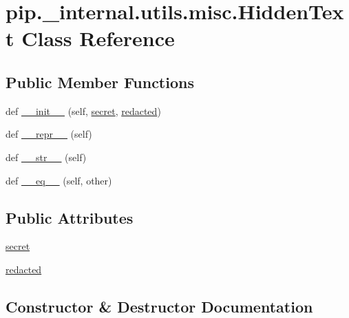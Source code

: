 \hypertarget{classpip_1_1__internal_1_1utils_1_1misc_1_1HiddenText}{}\section{pip.\+\_\+internal.\+utils.\+misc.\+Hidden\+Text Class Reference}
\label{classpip_1_1__internal_1_1utils_1_1misc_1_1HiddenText}
\subsection*{Public Member Functions}
\begin{DoxyCompactItemize}
\item 
def \hyperlink{classpip_1_1__internal_1_1utils_1_1misc_1_1HiddenText_a80a5e069d87d7a1997a9ceb48883479e}{\+\_\+\+\_\+init\+\_\+\+\_\+} (self, \hyperlink{classpip_1_1__internal_1_1utils_1_1misc_1_1HiddenText_aebe8a214872322901f368347a4449603}{secret}, \hyperlink{classpip_1_1__internal_1_1utils_1_1misc_1_1HiddenText_a7183b1d38734a749ba8a69126f20557a}{redacted})
\item 
def \hyperlink{classpip_1_1__internal_1_1utils_1_1misc_1_1HiddenText_a9bc27c6a58f062ed0c99fb73c4ea1a1c}{\+\_\+\+\_\+repr\+\_\+\+\_\+} (self)
\item 
def \hyperlink{classpip_1_1__internal_1_1utils_1_1misc_1_1HiddenText_a1931aa3ae663590a444d564b4f8990fb}{\+\_\+\+\_\+str\+\_\+\+\_\+} (self)
\item 
def \hyperlink{classpip_1_1__internal_1_1utils_1_1misc_1_1HiddenText_af13cc50e5644a79d0fe9da9e243321b2}{\+\_\+\+\_\+eq\+\_\+\+\_\+} (self, other)
\end{DoxyCompactItemize}
\subsection*{Public Attributes}
\begin{DoxyCompactItemize}
\item 
\hyperlink{classpip_1_1__internal_1_1utils_1_1misc_1_1HiddenText_aebe8a214872322901f368347a4449603}{secret}
\item 
\hyperlink{classpip_1_1__internal_1_1utils_1_1misc_1_1HiddenText_a7183b1d38734a749ba8a69126f20557a}{redacted}
\end{DoxyCompactItemize}


\subsection{Constructor \& Destructor Documentation}
\mbox{\label{classpip_1_1__internal_1_1utils_1_1misc_1_1HiddenText_a80a5e069d87d7a1997a9ceb48883479e}} 
